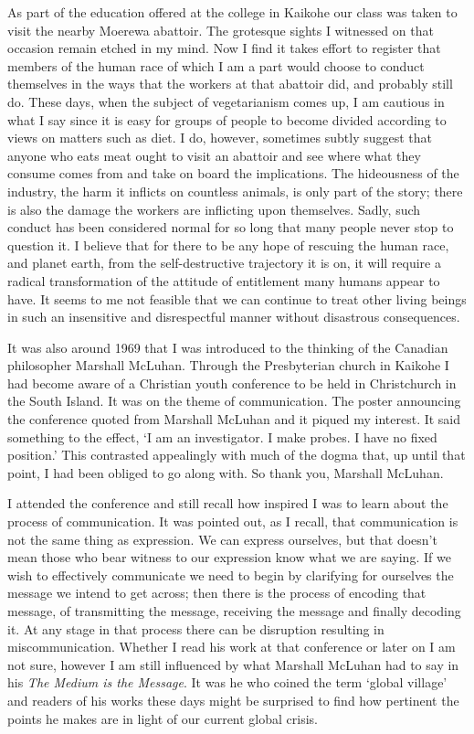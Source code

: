 \enlargethispage{\baselineskip}

As part of the education offered at the college in Kaikohe our class was
taken to visit the nearby Moerewa abattoir. The grotesque sights I
witnessed on that occasion remain etched in my mind. Now I find it takes
effort to register that members of the human race of which I am a part
would choose to conduct themselves in the ways that the workers at that
abattoir did, and probably still do. These days, when the subject of
vegetarianism comes up, I am cautious in what I say since it is easy for
groups of people to become divided according to views on matters such as
diet. I do, however, sometimes subtly suggest that anyone who eats meat
ought to visit an abattoir and see where what they consume comes from
and take on board the implications. The hideousness of the industry, the
harm it inflicts on countless animals, is only part of the story; there
is also the damage the workers are inflicting upon themselves.
Sadly, such conduct has been considered normal for so long that many people
never stop to question it. I believe that for there to be any hope of rescuing
the human race, and planet earth, from the self-destructive trajectory it is on,
it will require a radical transformation of the attitude of entitlement many
humans appear to have. It seems to me not feasible that we can continue to treat
other living beings in such an insensitive and disrespectful manner without
disastrous consequences.

It was also around 1969 that I was introduced to the thinking of the
Canadian philosopher Marshall McLuhan\cite{mcluhan}.
Through the Presbyterian church in Kaikohe I had
become aware of a Christian youth conference to be held in Christchurch
in the South Island. It was on the theme of communication. The poster
announcing the conference quoted from Marshall McLuhan and it piqued my
interest. It said something to the effect, `I am an investigator. I make
probes. I have no fixed position.' This contrasted appealingly with much
of the dogma that, up until that point, I had been obliged to go along
with. So thank you, Marshall McLuhan.

I attended the conference and still recall how inspired I was to learn
about the process of communication. It was pointed out, as I recall,
that communication is not the same thing as expression. We can express
ourselves, but that doesn't mean those who bear witness to our
expression know what we are saying. If we wish to effectively
communicate we need to begin by clarifying for ourselves the message we
intend to get across; then there is the process of encoding that
message, of transmitting the message, receiving the message and finally
decoding it. At any stage in that process there can be disruption
resulting in miscommunication. Whether I read his work at that
conference or later on I am not sure, however I am still influenced by
what Marshall McLuhan had to say in his \emph{The Medium is the
Message}. It was he who coined the term `global village' and readers of
his works these days might be surprised to find how pertinent the points
he makes are in light of our current global crisis.

